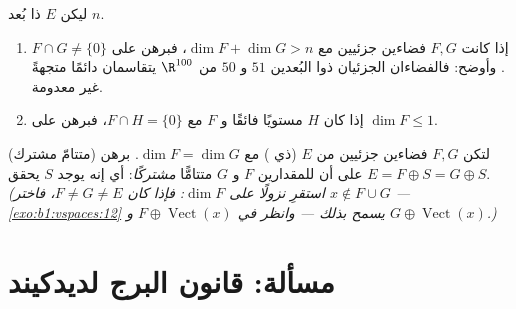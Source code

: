 \begin{exercise}[$\star\star$]\label{exo:b1:findim:11}
ليكن $E$ ذا بُعد $n$.
\begin{enumerate}
  \item إذا كانت $F, G$ فضاءين جزئيين مع $\dim F + \dim G > n$، فبرهن على
        $F \cap G \neq \{0\}$. وأوضح: فالفضاءان الجزئيان ذوا
        البُعدين $51$ و $50$ من $\R^{100}$ يتقاسمان دائمًا
        متجهةً غير معدومة.
  \item إذا كان $H$ مستويًا فائقًا و $F$  مع $F \cap H =
        \{0\}$، فبرهن على $\dim F \leq 1$.
\end{enumerate}
\end{exercise}

\begin{exercise}[$\star\star\star$]\label{exo:b1:findim:12}
(متتامّ مشترك) لتكن $F, G$ فضاءين جزئيين من $E$ (ذي ) مع $\dim F = \dim G$. برهن على أن للمقدارين $F$ و $G$
متتامًّا \emph{مشتركًا}: أي إنه يوجد  $S$ يحقق $E = F
\oplus S = G \oplus S$. \emph{(استقرِ نزولًا على $\dim F$: فإذا كان $F
\neq G \neq E$، فاختر $x \notin F \cup G$ ---
\cref{exo:b1:vspaces:12} يسمح بذلك --- وانظر في $F \oplus
\operatorname{Vect}(x)$ و $G \oplus \operatorname{Vect}(x)$.)}
\end{exercise}

\section{مسألة: قانون البرج لديدكيند}

